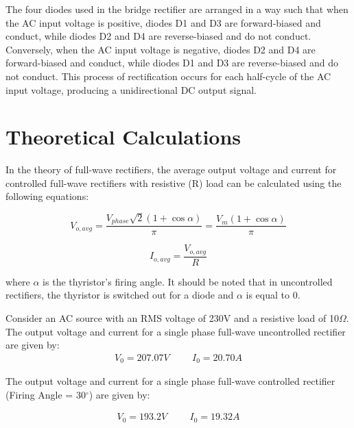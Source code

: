 The four diodes used in the bridge rectifier are arranged in a way such that when the AC input voltage is positive, diodes D1 and D3 are forward-biased and conduct, while diodes D2 and D4 are reverse-biased and do not conduct. Conversely, when the AC input voltage is negative, diodes D2 and D4 are forward-biased and conduct, while diodes D1 and D3 are reverse-biased and do not conduct. This process of rectification occurs for each half-cycle of the AC input voltage, producing a unidirectional DC output signal.


\section{Theoretical Calculations}
\hspace{\parindent}
In the theory of full-wave rectifiers, the average output voltage and current for controlled full-wave rectifiers with resistive (R) load can be calculated using the following equations:

\begin{equation}
    V_{o,avg}
    = \frac{V_{phase}\sqrt{2}(1+\cos\alpha)}{\pi}
    = \frac{V_m(1+\cos\alpha)}{\pi}
\end{equation}

\begin{equation}
    I_{o,avg} = \frac{V_{o,avg}}{R}
\end{equation}

where $\alpha$ is the thyristor's firing angle. It should be noted that in uncontrolled rectifiers, the thyristor is switched out for a diode and $\alpha$ is equal to 0.

Consider an AC source with an RMS voltage of 230V and a resistive load of 10$ \Omega $. The output voltage and current for a single phase full-wave uncontrolled rectifier are given by:
\begin{align}
    V_{0} = 207.07V \hspace{1cm}   I_{0} = 20.70A
\end{align}

The output voltage and current for a single phase full-wave controlled rectifier (Firing Angle = 30$ ^\circ $) are given by:

\vspace{-0.5cm}

\begin{align}
    V_{0} = 193.2V \hspace{1cm}   I_{0} = 19.32A
\end{align}

